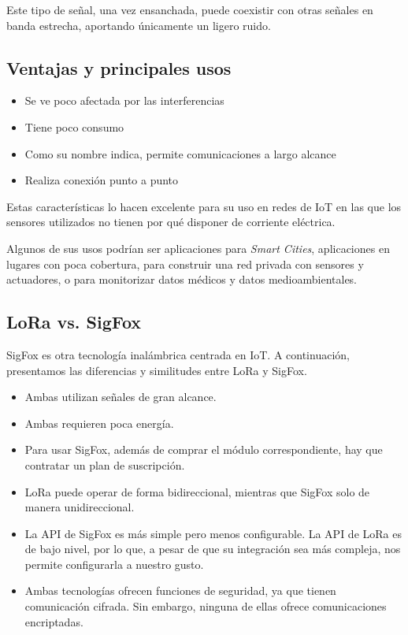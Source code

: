 \documentclass[11pt,a4paper]{article}
\begin{document}
Este tipo de señal, una vez ensanchada, puede coexistir con otras señales en banda estrecha, aportando únicamente un ligero ruido.

\subsection{Ventajas y principales usos}
\begin{itemize}
\item Se ve poco afectada por las interferencias
\item Tiene poco consumo
\item Como su nombre indica, permite comunicaciones a largo alcance
\item Realiza conexión punto a punto
\end{itemize}

Estas características lo hacen excelente para su uso en redes de IoT en las que los sensores utilizados no tienen por qué disponer de corriente eléctrica.

\medskip

Algunos de sus usos podrían ser aplicaciones para \textit{Smart Cities}, aplicaciones en lugares con poca cobertura, para construir una red privada con sensores y actuadores, o para monitorizar datos médicos y datos medioambientales.

\subsection{LoRa vs. SigFox}
SigFox es otra tecnología inalámbrica centrada en IoT. A continuación, presentamos las diferencias y similitudes entre LoRa y SigFox.

\begin{itemize}
\item Ambas utilizan señales de gran alcance.
\item Ambas requieren poca energía.
\item Para usar SigFox, además de comprar el módulo correspondiente, hay que contratar un plan de suscripción.
\item LoRa puede operar de forma bidireccional, mientras que SigFox solo de manera unidireccional.
\item La API de SigFox es más simple pero menos configurable. La API de LoRa es de bajo nivel, por lo que, a pesar de que su integración sea más compleja, nos permite configurarla a nuestro gusto.
\item Ambas tecnologías ofrecen funciones de seguridad, ya que tienen comunicación cifrada. Sin embargo, ninguna de ellas ofrece comunicaciones encriptadas.
\end{itemize}
\end{document}
